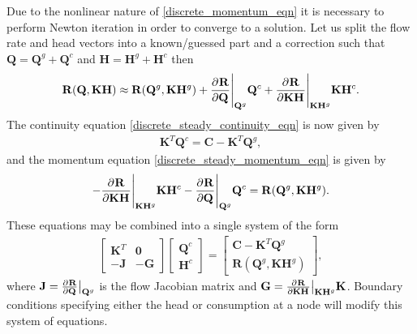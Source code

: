 Due to the nonlinear nature of \eqref{discrete_momentum_eqn} it is necessary to perform Newton iteration in order to converge to a solution. Let us split the flow rate and head vectors into a known/guessed part and a correction such that $\mathbf{Q} = \mathbf{Q}^g + \mathbf{Q}^c$ and $\mathbf{H} = \mathbf{H}^g + \mathbf{H}^c$ then 
\begin{align*}
\mathbf{R}(\mathbf{Q}, \mathbf{K} \mathbf{H}) \approx \mathbf{R}(\mathbf{Q}^g, \mathbf{K} \mathbf{H}^g ) + \frac{\partial^{} \mathbf{R}}{\partial \mathbf{Q}^{}} \Bigg\vert_{\mathbf{Q}^g} \mathbf{Q}^c + \frac{\partial^{} \mathbf{R}}{\partial \mathbf{K} \mathbf{H}^{}} \Bigg\vert_{\mathbf{K} \mathbf{H}^g} \mathbf{K} \mathbf{H}^c.
\end{align*}
The continuity equation \eqref{discrete_steady_continuity_eqn} is now given by
\begin{align}\label{discrete_steady_continuity_eqn_newton}
\mathbf{K}^T \mathbf{Q}^c = \mathbf{C} - \mathbf{K}^T \mathbf{Q}^g,
\end{align}
and the momentum equation \eqref{discrete_steady_momentum_eqn} is given by
\begin{align}\label{discrete_steady_momentum_eqn_newton}
- \frac{\partial^{} \mathbf{R}}{\partial \mathbf{K} \mathbf{H}^{}} \Bigg\vert_{\mathbf{K} \mathbf{H}^g} \mathbf{K} \mathbf{H}^c - \frac{\partial^{} \mathbf{R}}{\partial \mathbf{Q}^{}} \Bigg\vert_{\mathbf{Q}^g} \mathbf{Q}^c  = \mathbf{R}(\mathbf{Q}^g, \mathbf{K} \mathbf{H}^g).
\end{align}
These equations may be combined into a single system of the form
\begin{align}\label{discrete_steady_system}
\begin{bmatrix}
\mathbf{K}^T & \mathbf{0} \\
-\mathbf{J} & -\mathbf{G}
\end{bmatrix} 
\begin{bmatrix}
\mathbf{Q}^c \\ \mathbf{H}^c
\end{bmatrix} = \begin{bmatrix}
\mathbf{C} - \mathbf{K}^T \mathbf{Q}^g \\
\mathbf{R}(\mathbf{Q}^g, \mathbf{K} \mathbf{H}^g)
\end{bmatrix},
\end{align}
where $\mathbf{J} = \frac{\partial^{} \mathbf{R}}{\partial \mathbf{Q}^{}} \big\vert_{\mathbf{Q}^g}$ is the flow Jacobian matrix and $\mathbf{G} = \frac{\partial^{} \mathbf{R}}{\partial \mathbf{K} \mathbf{H}^{}} \big\vert_{\mathbf{K} \mathbf{H}^g} \mathbf{K}$. Boundary conditions specifying either the head or consumption at a node will modify this system of equations. 


